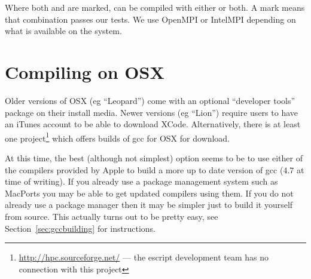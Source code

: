 \noindent Where both \openmp and \mpi are marked, \escript can be compiled with either or both.
A \checkmark mark means that combination passes our tests.
We use OpenMPI or IntelMPI depending on what is available on the system.



\section{Compiling on OSX}
Older versions of OSX (eg ``Leopard'') come with an optional ``developer tools'' package on their install media.
Newer versions (eg ``Lion'') require users to have an iTunes account to be able to download XCode.
Alternatively, there is at least one project\footnote{\url{http://hpc.sourceforge.net/} --- 
the escript development team has no connection with this project} which offers builds of gcc for OSX for download.

At this time,  the best (although not simplest) option seems to be to use either of the compilers 
provided by Apple to build a more up to date version of gcc ($4.7$ at time of writing).
If you already use a package management system such as MacPorts you may be able to get updated compilers using them.
If you do not already use a package manager then it may be simpler just to build it yourself from source.
This actually turns out to be pretty easy, see Section~\ref{sec:gccbuilding} for instructions.






